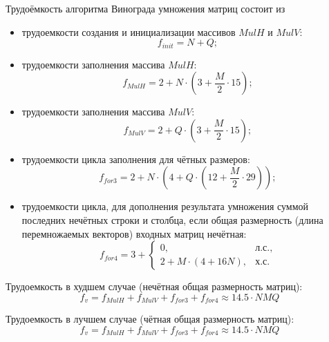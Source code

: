 Трудоёмкость алгоритма Винограда умножения матриц состоит из
\begin{itemize}
	\item трудоемкости создания и инициализации массивов $MulH$ и $MulV$:
	\begin{equation}
		\label{for:init}
		f_{init} = N + Q;
	\end{equation}
	
	\item трудоемкости заполнения массива $MulH$:
	\begin{equation}
		\label{for:MulH}
		f_{MulH} = 2 + N \cdot (3 + \frac{M}{2} \cdot 15);
	\end{equation}
	
	\item трудоемкости заполнения массива $MulV$:
	\begin{equation}
		\label{for:MulV}
		f_{MulV} = 2 + Q \cdot (3 + \frac{M}{2} \cdot 15);
	\end{equation}
	
	\item трудоемкости цикла заполнения для чётных размеров:
	\begin{equation}
		\label{for:cycle3}
		f_{for3} = 2 + N \cdot (4 + Q \cdot (12 + \frac{M}{2} \cdot 29));
	\end{equation}
	
	\item трудоемкости цикла, для дополнения результата умножения суммой последних нечётных строки и столбца, если общая размерность (длина перемножаемых векторов) входных матриц нечётная:
	\begin{equation}
		\label{for:cycle4}
		f_{for4} = 3 + \begin{cases}
			0, & \text{л.с.,}\\
			2 + M \cdot (4 + 16N), & \text{х.с.}
		\end{cases}
	\end{equation}
\end{itemize}

Трудоемкость в худшем случае (нечётная общая размерность матриц):
\begin{equation}
	\label{for:bad}
	f_{v} =  f_{MulH} + f_{MulV} + f_{for3} + f_{for4} \approx 14.5 \cdot NMQ
\end{equation}

Трудоемкость в лучшем случае (чётная общая размерность матриц):
\begin{equation}
	\label{for:good}
f_{v} =  f_{MulH} + f_{MulV} + f_{for3} + f_{for4} \approx 14.5 \cdot NMQ
\end{equation}


